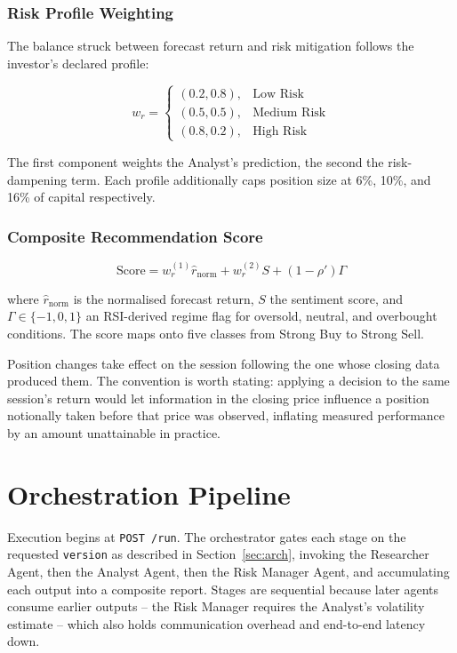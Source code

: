 \documentclass[conference]{IEEEtran}
\begin{document}
\subsubsection{Risk Profile Weighting}

The balance struck between forecast return and risk mitigation follows the investor's declared profile:

\[
w_r =
\begin{cases}
(0.2, 0.8), & \text{Low Risk} \\
(0.5, 0.5), & \text{Medium Risk} \\
(0.8, 0.2), & \text{High Risk}
\end{cases}
\]

The first component weights the Analyst's prediction, the second the risk-dampening term. Each profile additionally caps position size at 6\%, 10\%, and 16\% of capital respectively.

\subsubsection{Composite Recommendation Score}

\begin{equation}
\label{eq:final}
\mathrm{Score} = w_r^{(1)} \hat{r}_{\mathrm{norm}} + w_r^{(2)} S + (1-\rho')\Gamma
\end{equation}

where $\hat{r}_{\mathrm{norm}}$ is the normalised forecast return, $S$ the sentiment score, and $\Gamma \in \{-1,0,1\}$ an RSI-derived regime flag for oversold, neutral, and overbought conditions. The score maps onto five classes from Strong Buy to Strong Sell.

Position changes take effect on the session following the one whose closing data produced them. The convention is worth stating: applying a decision to the same session's return would let information in the closing price influence a position notionally taken before that price was observed, inflating measured performance by an amount unattainable in practice.

\section{Orchestration Pipeline}
\label{sec:pipeline}

Execution begins at \texttt{POST /run}. The orchestrator gates each stage on the
requested \texttt{version} as described in Section~\ref{sec:arch}, invoking the
Researcher Agent, then the Analyst Agent, then the Risk Manager Agent, and
accumulating each output into a composite report. Stages are sequential because
later agents consume earlier outputs -- the Risk Manager requires the Analyst's
volatility estimate -- which also holds communication overhead and end-to-end
latency down.
\end{document}
